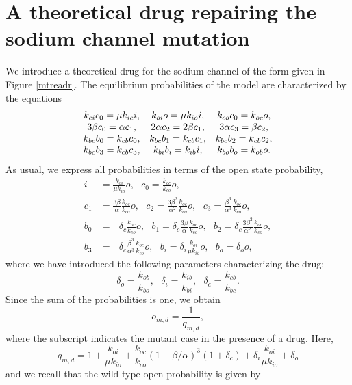 \section[Theoretical drug for the Sodium channel]{A theoretical drug repairing the sodium channel mutation}

We introduce a theoretical drug for the sodium channel of the form given in
Figure \ref{mtreadr}. The equilibrium probabilities of the model are characterized by the equations%
\[%
\begin{array}
[c]{ccc}%
k_{ci}c_{0}=\mu k_{ic}i, & k_{oi}o=\mu k_{io}i, & k_{co}c_{0}=k_{oc}o,\\
3\beta c_{0}=\alpha c_{1}, & 2\alpha c_{2}=2\beta c_{1}, & 3\alpha c_{3}=\beta
c_{2},\\
k_{bc}b_{0}=k_{cb}c_{0}, & k_{bc}b_{1}=k_{cb}c_{1}, & k_{bc}b_{2}=k_{cb}c_{2},\\
k_{bc}b_{3}=k_{cb}c_{3}, & k_{bi}b_{i}=k_{ib}i, & k_{bo}b_{o}=k_{ob}o.
\end{array}
\]
As usual, we express all probabilities in terms of the open state probability, \label{9001}%
\begin{align*}
i &  =\frac{k_{oi}}{\mu k_{io}}o,\text{ }c_{0}=\frac{k_{oc}}{k_{co}}o,\text{
}\\
c_{1} &  =\frac{3\beta}{\alpha}\frac{k_{oc}}{k_{co}}o,\text{ }c_{2}%
=\frac{3\beta^{2}}{\alpha^{2}}\frac{k_{oc}}{k_{co}}o,\text{ }c_{3}=\frac
{\beta^{3}}{\alpha^{3}}\frac{k_{oc}}{k_{co}}o,\\
b_{0} &  =\text{ }\delta_{c}\frac{k_{oc}}{k_{co}}o,\text{ }b_{1}=\text{
}\delta_{c}\frac{3\beta}{\alpha}\frac{k_{oc}}{k_{co}}o,\text{ }b_{2}=\text{
}\delta_{c}\frac{3\beta^{2}}{\alpha^{2}}\frac{k_{oc}}{k_{co}}o,\\
b_{3} &  =\text{ }\delta_{c}\frac{\beta^{3}}{\alpha^{3}}\frac{k_{oc}}{k_{co}%
}o,\text{ }b_{i}=\delta_{i}\frac{k_{oi}}{\mu k_{io}}o,\text{ }b_{o}=\delta
_{o}o,
\end{align*}
where we have introduced the following parameters characterizing the drug:%
\[
\delta_{o}=\frac{k_{ob}}{k_{bo}},\text{ }\delta_{i}=\frac{k_{ib}}{k_{bi}%
},\text{ }\delta_{c}=\frac{k_{cb}}{k_{bc}}.
\]
Since the sum of the probabilities is one, we obtain%
\[
o_{m,d}=\frac{1}{q_{m,d}},%
\]
where the subscript indicates the mutant case in the presence of a drug. Here,%
\[
q_{m,d}=1+\frac{k_{oi}}{\mu k_{io}}+\frac{k_{oc}}{k_{co}}\left(
1+\beta/\alpha\right)  ^{3}\left(  1+\delta_{c}\right)  +\delta_{i}%
\frac{k_{oi}}{\mu k_{io}}+\delta_{o}
\]
and we recall that the wild type open probability is given by 
